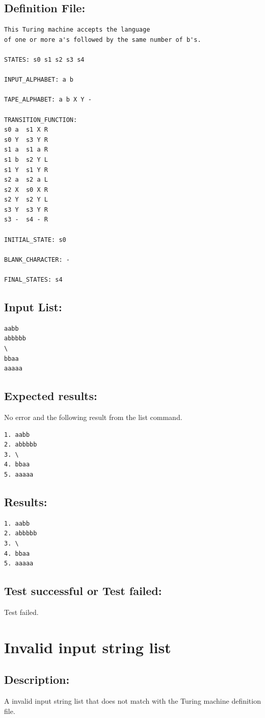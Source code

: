 \documentclass{report}
\begin{document}
\section{Definition File: }
\begin{verbatim}
This Turing machine accepts the language 
of one or more a's followed by the same number of b's.

STATES: s0 s1 s2 s3 s4
	
INPUT_ALPHABET: a b

TAPE_ALPHABET: a b X Y -

TRANSITION_FUNCTION:
s0 a  s1 X R
s0 Y  s3 Y R
s1 a  s1 a R
s1 b  s2 Y L
s1 Y  s1 Y R
s2 a  s2 a L
s2 X  s0 X R
s2 Y  s2 Y L
s3 Y  s3 Y R
s3 -  s4 - R

INITIAL_STATE: s0

BLANK_CHARACTER: -

FINAL_STATES: s4
\end{verbatim}
\section{Input List:} 
\begin{verbatim}
aabb
abbbbb
\
bbaa
aaaaa
\end{verbatim}
\section{Expected results:} No error and the following result from the list command.
\begin{verbatim}
1. aabb
2. abbbbb
3. \
4. bbaa
5. aaaaa
\end{verbatim}
\section{Results:} 
\begin{verbatim}
1. aabb
2. abbbbb
3. \
4. bbaa
5. aaaaa
\end{verbatim}

\section{Test successful or Test failed:} Test failed.

\pagebreak

\chapter{Invalid input string list}
     
\section{Description:} A invalid input string list that does not match with the Turing machine definition file.
\end{document}
